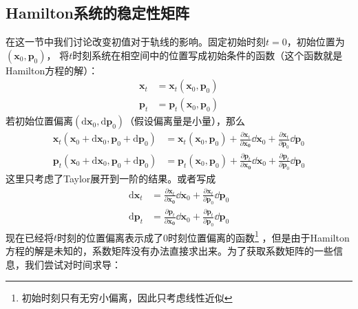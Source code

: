     \subsection{Hamilton系统的稳定性矩阵}
    在这一节中我们讨论改变初值对于轨线的影响。固定初始时刻$t=0$，初始位置为$(\bm{x}_0, \bm{p}_0)$，
    将$t$时刻系统在相空间中的位置写成初始条件的函数（这个函数就是Hamilton方程的解）：
    \begin{equation}
        \begin{split}
            \bm{x}_t &= \bm{x}_t(\bm{x}_0, \bm{p}_0)\\
            \bm{p}_t &= \bm{p}_t(\bm{x}_0, \bm{p}_0)
        \end{split}
    \end{equation}
    若初始位置偏离$(\mathrm{d}\bm{x}_0,\mathrm{d}\bm{p}_0)$（假设偏离量是小量），那么
    \begin{equation}
        \begin{split}
        \bm{x}_t(\bm{x}_0+\mathrm{d}\bm{x}_0, \bm{p}_0+\mathrm{d}\bm{p}_0) &= \bm{x}_t(\bm{x}_0, \bm{p}_0) + \frac {\partial \bm{x}_t}{\partial \bm{x_0}} \dd \bm{x}_0 + \frac {\partial \bm{x}_t}{\partial \bm{p}_0} \dd \bm{p}_0\\
        \bm{p}_t(\bm{x}_0+\mathrm{d}\bm{x}_0, \bm{p}_0+\mathrm{d}\bm{p}_0) &= \bm{p}_t(\bm{x}_0, \bm{p}_0) + \frac {\partial \bm{p}_t}{\partial \bm{x_0}} \dd \bm{x}_0 + \frac {\partial \bm{p}_t}{\partial \bm{p}_0} \dd \bm{p}_0
        \end{split}
    \end{equation}
    这里只考虑了Taylor展开到一阶的结果。或者写成
    \begin{equation}
        \begin{split}
            \mathrm{d}\bm{x}_t &= \frac {\partial \bm{x}_t}{\partial \bm{x_0}} \dd \bm{x}_0 + \frac {\partial \bm{x}_t}{\partial \bm{p}_0} \dd \bm{p}_0\\
            \mathrm{d}\bm{p}_t &= \frac {\partial \bm{p}_t}{\partial \bm{x_0}} \dd \bm{x}_0 + \frac {\partial \bm{p}_t}{\partial \bm{p}_0} \dd \bm{p}_0
        \end{split}
        \end{equation}
    现在已经将$t$时刻的位置偏离表示成了0时刻位置偏离的函数\footnote{初始时刻只有无穷小偏离，因此只考虑线性近似}
    ，但是由于Hamilton方程的解是未知的，系数矩阵没有办法直接求出来。为了获取系数矩阵的一些信息，我们尝试对时间求导：
